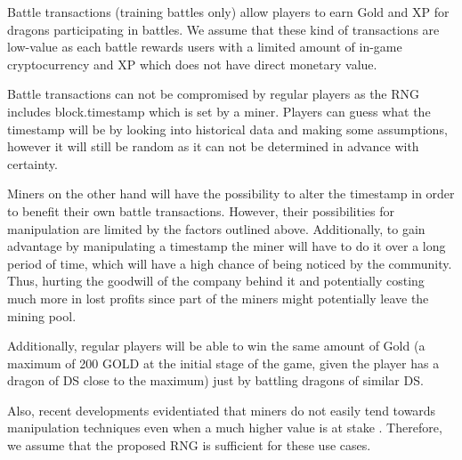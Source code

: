 \documentclass[12pt]{article}
\begin{document}
\begin{justify}
Battle transactions (training battles only) allow players to earn Gold and XP for dragons participating in battles. We assume that these kind of transactions are low-value as each battle rewards users with a limited amount of in-game cryptocurrency and XP which does not have direct monetary value.
\end{justify}\par

\begin{justify}
Battle transactions can not be compromised by regular players as the RNG includes block.timestamp which is set by a miner. Players can guess what the timestamp will be by looking into historical data and making some assumptions, however it will still be random as it can not be determined in advance with certainty.
\end{justify}\par

\begin{justify}
Miners on the other hand will have the possibility to alter the timestamp in order to benefit their own battle transactions. However, their possibilities for manipulation are limited by the factors outlined above. Additionally, to gain advantage by manipulating a timestamp the miner will have to do it over a long period of time, which will have a high chance of being noticed by the community. Thus, hurting the goodwill of the company behind it and potentially costing much more in lost profits since part of the miners might potentially leave the mining pool.
\end{justify}\par

\begin{justify}
Additionally, regular players will be able to win the same amount of Gold (a maximum of 200 GOLD at the initial stage of the game, given the player has a dragon of DS close to the maximum) just by battling dragons of similar DS.
\end{justify}\par

\begin{justify}
Also, recent developments evidentiated that miners do not easily tend towards manipulation techniques even when a much higher value is at stake  \cite{SECBIT_2018_Aug_22}. Therefore, we assume that the proposed RNG is sufficient for these use cases.
\end{justify}\par
\end{document}
